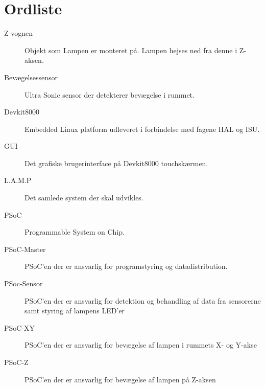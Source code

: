 \chapter*{Ordliste}

\begin{description}
    \item [Z-vognen] Objekt som Lampen er monteret på. Lampen hejses ned fra denne i Z-aksen.
    \item [Bevægelsessensor] Ultra Sonic sensor der detekterer bevægelse i rummet.
    \item [Devkit8000] Embedded Linux platform udleveret i forbindelse med fagene HAL og ISU.
    \item [GUI] Det grafiske brugerinterface på Devkit8000 touchskærmen.
    \item [L.A.M.P] Det samlede system der skal udvikles.
    \item [PSoC] Programmable System on Chip.
    \item [PSoC-Master] PSoC'en der er ansvarlig for programstyring og datadistribution.
    \item [PSoc-Sensor] PSoC'en der er ansvarlig for detektion og behandling af data fra sensorerne samt styring af lampens LED'er
    \item [PSoC-XY] PSoC'en der er ansvarlig for bevægelse af lampen i rummets X- og Y-akse
    \item [PSoC-Z] PSoC'en der er ansvarlig for bevægelse af lampen på Z-aksen
    

\end{description}

